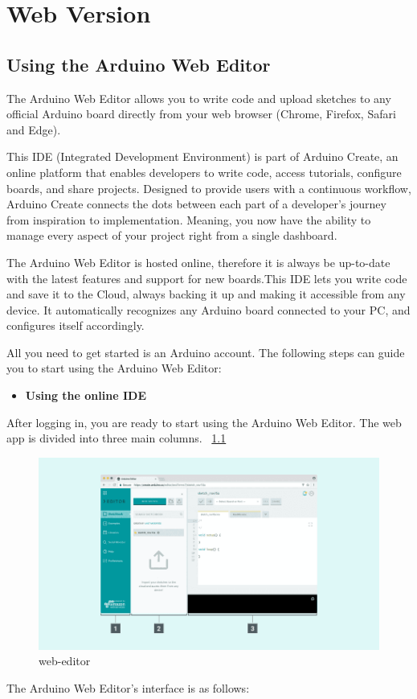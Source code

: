 \chapter{Web Version}

\section{Using the Arduino Web Editor}


The Arduino Web Editor allows you to write code and upload sketches to any official Arduino board directly from your web browser (Chrome, Firefox, Safari and Edge).

This IDE (Integrated Development Environment) is part of Arduino Create, an online platform that enables developers to write code, access tutorials, configure boards, and share projects. Designed to provide users with a continuous workflow, Arduino Create connects the dots between each part of a developer's journey from inspiration to implementation. Meaning, you now have the ability to manage every aspect of your project right from a single dashboard.

The Arduino Web Editor is hosted online, therefore it is always be up-to-date with the latest features and support for new boards.This IDE lets you write code and save it to the Cloud, always backing it up and making it accessible from any device. It automatically recognizes any Arduino board connected to your PC, and configures itself accordingly.

All you need to get started is an Arduino account. The following steps can guide you to start using the Arduino Web Editor: \cite{arduinoWebEditor:2024}
\begin{itemize}
	\item \textbf{Using the online IDE}
\end{itemize}
After logging in, you are ready to start using the Arduino Web Editor. The web app is divided into three main columns. ~\ref{web-editor}

\begin{figure}
	\begin{center}
		\includegraphics[width=0.7\linewidth]{Images/Arduino/web-editor.png}
		\caption{web-editor}
		\label{web-editor}
	\end{center}
\end{figure}
The Arduino Web Editor’s interface is as follows:

